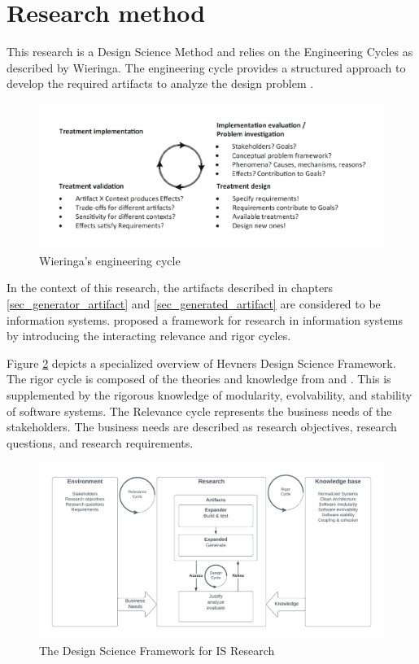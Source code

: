 \section{Research method} \label{sec_research_method}

This research is a Design Science Method and relies on the Engineering Cycles as described
by Wieringa. The engineering cycle provides a structured approach to develop the
required artifacts to analyze the design problem \parencite{wieringa_design_2014-1}.

\begin{figure}[H]
    \centering
    \includegraphics[width=1\textwidth]{Figures/engineering_cycle.pdf}
    \caption[Engineering cycle]{Wieringa's engineering cycle}
    \label{fig_engineering_cycle}
\end{figure}

In the context of this research, the artifacts described in chapters
\ref{sec_generator_artifact} and \ref{sec_generated_artifact} are considered to be
information systems. \citeauthor{hevner_design_nodate} proposed a framework for research
in information systems by introducing the interacting relevance and rigor cycles.

Figure \ref{fig_dsr} depicts a specialized overview of Hevners Design Science Framework.
The rigor cycle is composed of the theories and knowledge from \ns
and \ca. This is supplemented by the rigorous knowledge of modularity,
evolvability, and stability of software systems. The Relevance cycle represents the
business needs of the stakeholders. The business needs are described as research
objectives, research questions, and research requirements.

\begin{figure}[H]
    \centering
    \includegraphics[width=1\textwidth]{Figures/rigor_relevance_cycle.pdf}
    \caption[DSF]{The Design Science Framework for IS Research}
    \label{fig_dsr}
\end{figure}